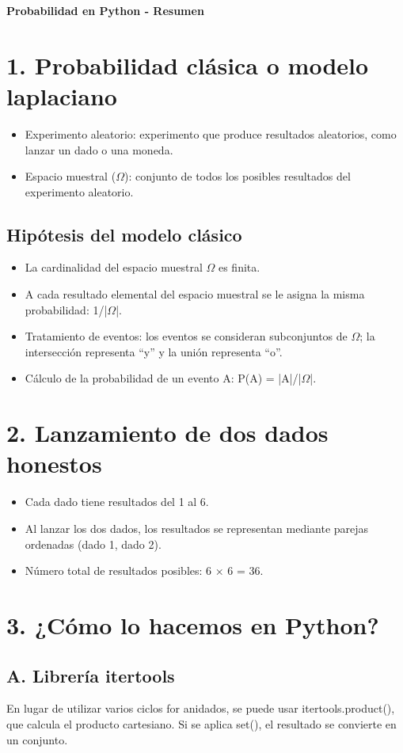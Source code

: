 \documentclass[10pt]{article}
\begin{document}
\begin{center}
{\Large\bfseries Probabilidad en Python - Resumen}
\end{center}
\section*{1. Probabilidad clásica o modelo laplaciano}
\begin{itemize}
\item Experimento aleatorio: experimento que produce resultados aleatorios, como lanzar un dado o una moneda.
\item Espacio muestral ($\Omega$): conjunto de todos los posibles resultados del experimento aleatorio.
\end{itemize}
\subsection*{Hipótesis del modelo clásico}
\begin{itemize}
\item La cardinalidad del espacio muestral $\Omega$ es finita.
\item A cada resultado elemental del espacio muestral se le asigna la misma probabilidad: 1/|$\Omega$|.
\item Tratamiento de eventos: los eventos se consideran subconjuntos de $\Omega$; la intersección representa “y” y la unión representa “o”.
\item Cálculo de la probabilidad de un evento A: P(A) = |A|/|$\Omega$|.
\end{itemize}
\section*{2. Lanzamiento de dos dados honestos}
\begin{itemize}
\item Cada dado tiene resultados del 1 al 6.
\item Al lanzar los dos dados, los resultados se representan mediante parejas ordenadas (dado 1, dado 2).
\item Número total de resultados posibles: 6 × 6 = 36.
\end{itemize}
\section*{3. ¿Cómo lo hacemos en Python?}
\subsection*{A. Librería itertools}
En lugar de utilizar varios ciclos for anidados, se puede usar itertools.product(), que calcula el producto cartesiano. Si se aplica set(), el resultado se convierte en un conjunto.
\end{document}
